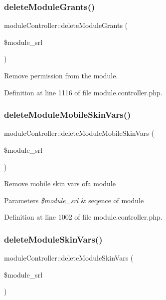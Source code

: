 \subsubsection{\texorpdfstring{delete\+Module\+Grants()}{deleteModuleGrants()}}
{\footnotesize\ttfamily module\+Controller\+::delete\+Module\+Grants (\begin{DoxyParamCaption}\item[{}]{\$module\+\_\+srl }\end{DoxyParamCaption})}



Remove permission from the module. 



Definition at line 1116 of file module.\+controller.\+php.

\mbox{\label{classmoduleController_a16feed706aef2613cc417c68cb06ba8a}} 
\subsubsection{\texorpdfstring{delete\+Module\+Mobile\+Skin\+Vars()}{deleteModuleMobileSkinVars()}}
{\footnotesize\ttfamily module\+Controller\+::delete\+Module\+Mobile\+Skin\+Vars (\begin{DoxyParamCaption}\item[{}]{\$module\+\_\+srl }\end{DoxyParamCaption})}

Remove mobile skin vars ofa module 
\begin{DoxyParams}{Parameters}
{\em \$module\+\_\+srl} & seqence of module \\
\hline
\end{DoxyParams}


Definition at line 1002 of file module.\+controller.\+php.

\mbox{\label{classmoduleController_ad85915b5cf2a31804f673cfc3320ac75}} 
\subsubsection{\texorpdfstring{delete\+Module\+Skin\+Vars()}{deleteModuleSkinVars()}}
{\footnotesize\ttfamily module\+Controller\+::delete\+Module\+Skin\+Vars (\begin{DoxyParamCaption}\item[{}]{\$module\+\_\+srl }\end{DoxyParamCaption})}

